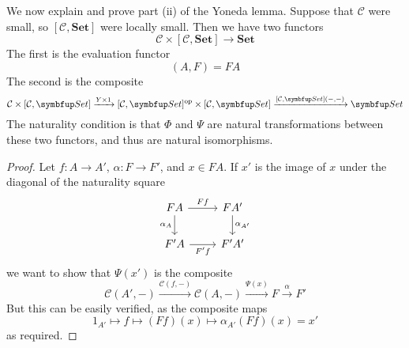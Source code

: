 We now explain and prove part (ii) of the Yoneda lemma.
Suppose that \( \mathcal C \) were small, so \( [\mathcal C, \mathbf{Set}] \) were locally small.
Then we have two functors
\[ \mathcal C \times [\mathcal C, \mathbf{Set}] \to \mathbf{Set} \]
The first is the evaluation functor
\[ (A, F) = FA \]
The second is the composite
\[ \mathcal C \times [\mathcal C, \mathbf{Set}] \xrightarrow{Y \times 1} [\mathcal C, \mathbf{Set}]^\cop \times [\mathcal C, \mathbf{Set}] \xrightarrow{[\mathcal C, \mathbf{Set}](-, -)} \mathbf{Set} \]
The naturality condition is that \( \Phi \) and \( \Psi \) are natural transformations between these two functors, and thus are natural isomorphisms.
\begin{proof}
    Let \( f : A \to A' \), \( \alpha : F \to F' \), and \( x \in F A \).
    If \( x' \) is the image of \( x \) under the diagonal of the naturality square
    \[\begin{tikzcd}
        FA & {FA'} \\
        {F'A} & {F'A'}
        \arrow["Ff", from=1-1, to=1-2]
        \arrow["{\alpha_{A'}}", from=1-2, to=2-2]
        \arrow["{\alpha_A}"', from=1-1, to=2-1]
        \arrow["{F'f}"', from=2-1, to=2-2]
    \end{tikzcd}\]
    we want to show that \( \Psi(x') \) is the composite
    \[ \mathcal C(A', -) \xrightarrow{\mathcal C(f, -)} \mathcal C(A, -) \xrightarrow{\Psi(x)} F \xrightarrow \alpha F' \]
    But this can be easily verified, as the composite maps
    \[ 1_{A'} \mapsto f \mapsto (Ff)(x) \mapsto \alpha_{A'}(Ff)(x) = x' \]
    as required.
\end{proof}

